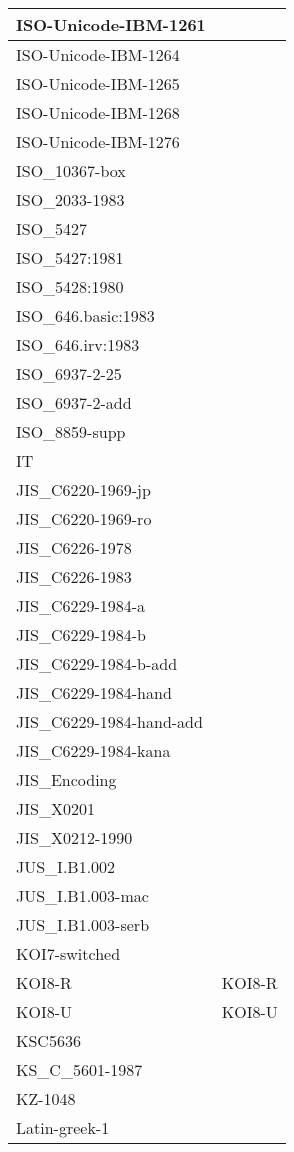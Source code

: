 \documentclass{wg21}
\begin{document}
\begin{longtable}{| p{} | p{} |}
ISO-Unicode-IBM-1261 & \\ \hline
ISO-Unicode-IBM-1264 & \\ \hline
ISO-Unicode-IBM-1265 & \\ \hline
ISO-Unicode-IBM-1268 & \\ \hline
ISO-Unicode-IBM-1276 & \\ \hline
ISO_10367-box & \\ \hline
ISO_2033-1983 & \\ \hline
ISO_5427 & \\ \hline
ISO_5427:1981 & \\ \hline
ISO_5428:1980 & \\ \hline
ISO_646.basic:1983 & \\ \hline
ISO_646.irv:1983 & \\ \hline
ISO_6937-2-25 & \\ \hline
ISO_6937-2-add & \\ \hline
ISO_8859-supp & \\ \hline
IT & \\ \hline
JIS_C6220-1969-jp & \\ \hline
JIS_C6220-1969-ro & \\ \hline
JIS_C6226-1978 & \\ \hline
JIS_C6226-1983 & \\ \hline
JIS_C6229-1984-a & \\ \hline
JIS_C6229-1984-b & \\ \hline
JIS_C6229-1984-b-add & \\ \hline
JIS_C6229-1984-hand & \\ \hline
JIS_C6229-1984-hand-add & \\ \hline
JIS_C6229-1984-kana & \\ \hline
JIS_Encoding & \\ \hline
JIS_X0201 & \\ \hline
JIS_X0212-1990 & \\ \hline
JUS_I.B1.002 & \\ \hline
JUS_I.B1.003-mac & \\ \hline
JUS_I.B1.003-serb & \\ \hline
KOI7-switched & \\ \hline
KOI8-R & KOI8-R\\ \hline
KOI8-U & KOI8-U\\ \hline
KSC5636 & \\ \hline
KS_C_5601-1987 & \\ \hline
KZ-1048 & \\ \hline
Latin-greek-1 & \\ \hline

\end{longtable}
\end{document}
